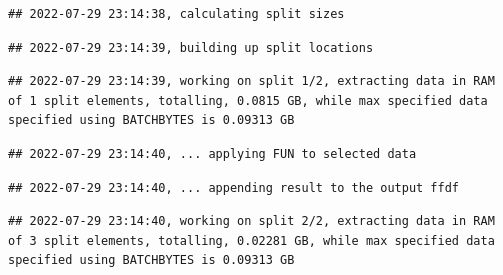 \documentclass[
  12pt,
]{style/krantz}
\newenvironment{Shaded}{\begin{snugshade}}{\end{snugshade}}
\newcommand{\AttributeTok}[1]{\textcolor[rgb]{0.77,0.63,0.00}{#1}}
\newcommand{\CommentTok}[1]{\textcolor[rgb]{0.56,0.35,0.01}{\textit{#1}}}
\newcommand{\ConstantTok}[1]{\textcolor[rgb]{0.00,0.00,0.00}{#1}}
\newcommand{\ControlFlowTok}[1]{\textcolor[rgb]{0.13,0.29,0.53}{\textbf{#1}}}
\newcommand{\DecValTok}[1]{\textcolor[rgb]{0.00,0.00,0.81}{#1}}
\newcommand{\FunctionTok}[1]{\textcolor[rgb]{0.00,0.00,0.00}{#1}}
\newcommand{\NormalTok}[1]{#1}
\newcommand{\OtherTok}[1]{\textcolor[rgb]{0.56,0.35,0.01}{#1}}
\newcommand{\SpecialCharTok}[1]{\textcolor[rgb]{0.00,0.00,0.00}{#1}}
\begin{document}
\begin{Shaded}
\end{Shaded}

\begin{verbatim}
## 2022-07-29 23:14:38, calculating split sizes
\end{verbatim}

\begin{verbatim}
## 2022-07-29 23:14:39, building up split locations
\end{verbatim}

\begin{verbatim}
## 2022-07-29 23:14:39, working on split 1/2, extracting data in RAM of 1 split elements, totalling, 0.0815 GB, while max specified data specified using BATCHBYTES is 0.09313 GB
\end{verbatim}

\begin{verbatim}
## 2022-07-29 23:14:40, ... applying FUN to selected data
\end{verbatim}

\begin{verbatim}
## 2022-07-29 23:14:40, ... appending result to the output ffdf
\end{verbatim}

\begin{verbatim}
## 2022-07-29 23:14:40, working on split 2/2, extracting data in RAM of 3 split elements, totalling, 0.02281 GB, while max specified data specified using BATCHBYTES is 0.09313 GB
\end{verbatim}
\end{document}
